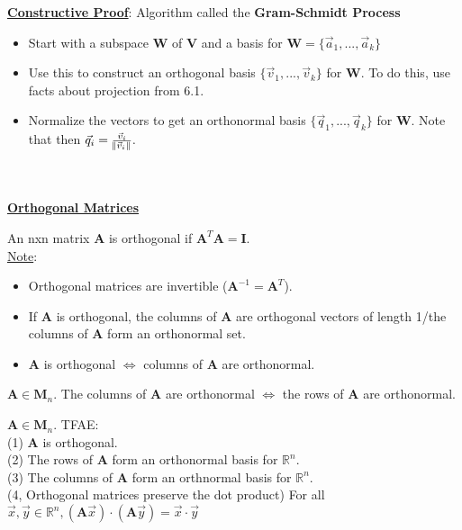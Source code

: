 \documentclass{article}
\begin{document}
\textbf{\underline{Constructive Proof}}: Algorithm called the \textbf{Gram-Schmidt Process} \\
\begin{itemize}
\item Start with a subspace $\boldsymbol{W}$ of $\boldsymbol{V}$ and a basis for $\boldsymbol{W} = \{\vec{a}_{1}, ..., \vec{a}_{k}\}$
\item Use this to construct an orthogonal basis $\{\vec{v}_{1}, ..., \vec{v}_{k}\}$ for $\boldsymbol{W}.$ To do this, use facts about projection from 6.1.
\item Normalize the vectors to get an orthonormal basis $\{\vec{q}_{1}, ..., \vec{q}_{k}\}$ for $\boldsymbol{W}.$ Note that then $\vec{q}_{i} = \frac{\vec{v}_{i}}{\norm{\vec{v}_{i}}}.$ \\ \\ \\
\end{itemize}

\underline{\textbf{Orthogonal Matrices}}
\begin{definition}
An nxn matrix $\boldsymbol{A}$ is orthogonal if $\boldsymbol{A}^{T}\boldsymbol{A} = \boldsymbol{I}.$ \\
\underline{Note}: \begin{itemize}
\item Orthogonal matrices are invertible ($\boldsymbol{A}^{-1} = \boldsymbol{A}^{T}$).
\item If $\boldsymbol{A}$ is orthogonal, the columns of $\boldsymbol{A}$ are orthogonal vectors of length 1/the columns of $\boldsymbol{A}$ form an orthonormal set.
\item $\boldsymbol{A}$ is orthogonal $\iff$ columns of $\boldsymbol{A}$ are orthonormal.
\end{itemize}
\end{definition}

\begin{theorem}
$\boldsymbol{A} \in \boldsymbol{M}_{n}.$ The columns of $\boldsymbol{A}$ are orthonormal $\iff$ the rows of $\boldsymbol{A}$ are orthonormal.
\end{theorem}

\begin{theorem}
$\boldsymbol{A} \in \boldsymbol{M}_{n}$. TFAE: \\
(1) $\boldsymbol{A}$ is orthogonal. \\
(2) The rows of $\boldsymbol{A}$ form an orthonormal basis for $\mathbb{R}^n.$ \\
(3) The columns of $\boldsymbol{A}$ form an orthnormal basis for $\mathbb{R}^n.$ \\
(4, Orthogonal matrices preserve the dot product) For all $\vec{x}, \vec{y} \in \mathbb{R}^n, (\boldsymbol{A}\vec{x}) \cdot (\boldsymbol{A}\vec{y}) = \vec{x} \cdot \vec{y}$ 
\end{theorem}
\end{document}
